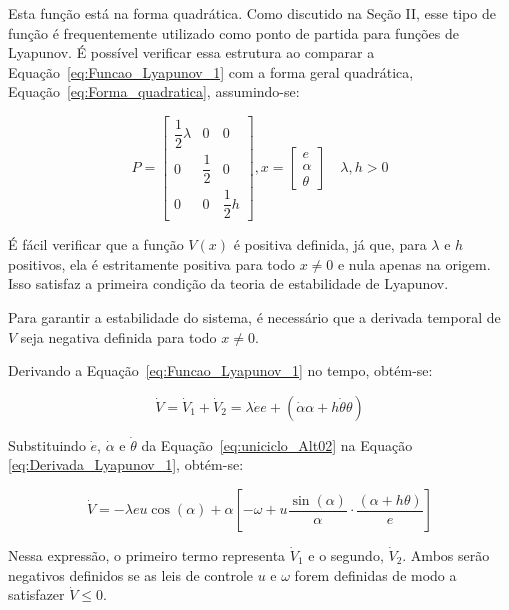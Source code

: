 \documentclass[conference]{IEEEtran}
\begin{document}
Esta função está na forma quadrática. Como discutido na Seção II, esse tipo de função é frequentemente utilizado como ponto de partida para funções de Lyapunov. É possível verificar essa estrutura ao comparar a Equação~\ref{eq:Funcao_Lyapunov_1} com a forma geral quadrática, Equação~\ref{eq:Forma_quadratica}, assumindo-se:

\begin{equation}
    P =
    \begin{bmatrix}
        \dfrac{1}{2}\lambda & 0 & 0\\
        0 & \dfrac{1}{2} & 0\\
        0 & 0 & \dfrac{1}{2}h
    \end{bmatrix},
    x = 
    \begin{bmatrix}
        e\\
        \alpha\\
        \theta
    \end{bmatrix}
    \quad
    \lambda, h > 0
\end{equation}

É fácil verificar que a função $V(x)$ é positiva definida, já que, para $\lambda$ e $h$ positivos, ela é estritamente positiva para todo $x \neq 0$ e nula apenas na origem. Isso satisfaz a primeira condição da teoria de estabilidade de Lyapunov.

Para garantir a estabilidade do sistema, é necessário que a derivada temporal de $V$ seja negativa definida para todo $x \neq 0$. 

Derivando a Equação~\ref{eq:Funcao_Lyapunov_1} no tempo, obtém-se:

\begin{equation}
    \dot{V} = \dot{V}_1 + \dot{V}_2 = \lambda \dot{e} e + \left( \dot{\alpha} \alpha + h\dot{\theta} \theta \right)
    \label{eq:Derivada_Lyapunov_1}
\end{equation}

Substituindo $\dot{e}$, $\dot{\alpha}$ e $\dot{\theta}$ da Equação~\ref{eq:uniciclo_Alt02} na Equação \ref{eq:Derivada_Lyapunov_1}, obtém-se:

\begin{equation}
    \dot{V} = -\lambda e u \cos(\alpha) + \alpha \left[ -\omega + u \dfrac{\sin(\alpha)}{\alpha} \cdot \dfrac{(\alpha + h\theta)}{e} \right]
    \label{eq:Derivada_Lyapunov_1_Comp}
\end{equation}

Nessa expressão, o primeiro termo representa $\dot{V}_1$ e o segundo, $\dot{V}_2$. Ambos serão negativos definidos se as leis de controle $u$ e $\omega$ forem definidas de modo a satisfazer $\dot{V} \leq 0$.
\end{document}
